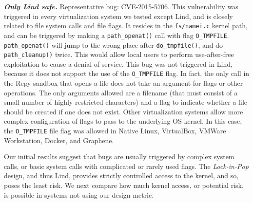 {{\emph{\textbf{Only Lind safe.}}  Representative bug: CVE-2015-5706.
This vulnerability was triggered in every virtualization system we tested except Lind,
and is closely related to file system calls and file flags. It resides in the \texttt{fs/namei.c}
kernel path, \lois{[popular or unpopular path?} and can be triggered by making a \texttt{path\_openat()}
call with flag \texttt{O\_TMPFILE}. \texttt{path\_openat()} will jump to the wrong
place after \texttt{do\_tmpfile()}, and do \texttt{path\_cleanup()} twice. This would
allow local users to perform use-after-free exploitation to cause a denial of service.
This bug was not triggered in Lind, because it does not support the use of the
\texttt{O\_TMPFILE} flag. In fact, the only call in the Repy sandbox that
opens a file does not take an argument for flags or other operations.  The
only arguments allowed are a filename (that must consist of a small number
of highly restricted characters) and a flag to indicate whether a file should
be created if one does not exist.
Other virtualization systems allow more complex configuration of flags to
pass to the underlying OS kernel.
In this case, the \texttt{O\_TMPFILE} file flag was
allowed in Native Linux, VirtualBox, VMWare Workstation, Docker, and Graphene.

Our initial results %
suggest that bugs are usually triggered by complex system calls, or basic system calls
with complicated or rarely used flags. The \emph{Lock-in-Pop} design, and thus Lind,
provides strictly controlled access to the kernel, and so, poses
the least risk. We next compare how
much kernel access, or potential risk, is  possible in systems not
using our design metric.


}}
